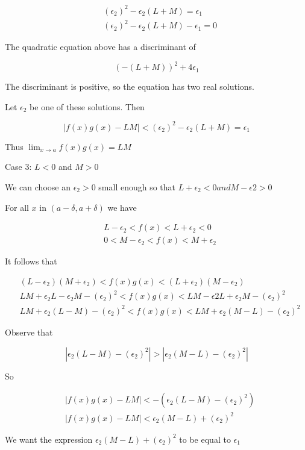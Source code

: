 \begin{align*}
& (\epsilon_2)^2 - \epsilon_2(L + M) = \epsilon_1 \\
& (\epsilon_2)^2 - \epsilon_2(L + M) - \epsilon_1 = 0
\end{align*}

The quadratic equation above has a discriminant of

    $$ (-(L + M))^2 + 4\epsilon_1 $$

The discriminant is positive, so the equation has two real solutions.

Let $\epsilon_2$ be one of these solutions. Then

    $$ |f(x)g(x) - LM| < (\epsilon_2)^2 - \epsilon_2(L + M) = \epsilon_1 $$

Thus $\lim_{x \rightarrow a} f(x)g(x) = LM$

Case 3: $L < 0$ and $M > 0$

We can choose an $\epsilon_2 > 0$ small enough so that $L + \epsilon_2 < 0 and M - \epsilon2 > 0$

For all $x$ in $(a - \delta, a + \delta)$ we have

\begin{align*}
& L - \epsilon_2 < f(x) < L + \epsilon_2 < 0 \\
& 0 < M - \epsilon_2 < f(x) < M + \epsilon_2 
\end{align*}

It follows that

\begin{align*}
& (L - \epsilon_2)(M + \epsilon_2) < f(x)g(x) < (L + \epsilon_2)(M - \epsilon_2) \\
& LM + \epsilon_2L - \epsilon_2M - (\epsilon_2)^2 < f(x)g(x) < LM - \epsilon2L + \epsilon_2M - (\epsilon_2)^2 \\
& LM + \epsilon_2(L - M) - (\epsilon_2)^2 < f(x)g(x) < LM + \epsilon_2(M - L) - (\epsilon_2)^2
\end{align*}

Observe that

$$ |\epsilon_2(L - M) - (\epsilon_2)^2| > |\epsilon_2(M - L) - (\epsilon_2)^2| $$

So

\begin{align*}
& |f(x)g(x) - LM| < -(\epsilon_2(L - M) - (\epsilon_2)^2) \\
& |f(x)g(x) - LM| < \epsilon_2(M - L) + (\epsilon_2)^2
\end{align*}

We want the expression $\epsilon_2(M - L) + (\epsilon_2)^2$ to be equal to $\epsilon_1$

